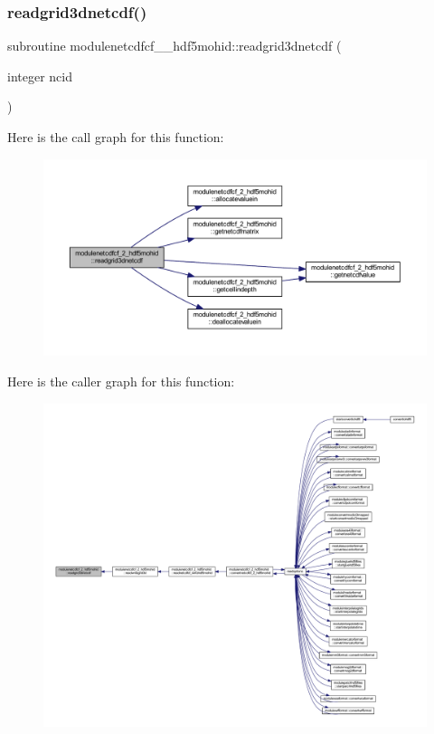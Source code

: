 \subsubsection{\texorpdfstring{readgrid3dnetcdf()}{readgrid3dnetcdf()}}
{\footnotesize\ttfamily subroutine modulenetcdfcf\+\_\+\_\+hdf5mohid\+::readgrid3dnetcdf (\begin{DoxyParamCaption}\item[{integer}]{ncid }\end{DoxyParamCaption})\hspace{0.3cm}{\ttfamily [private]}}

Here is the call graph for this function\+:\nopagebreak
\begin{figure}[H]
\begin{center}
\leavevmode
\includegraphics[width=350pt]{namespacemodulenetcdfcf__2__hdf5mohid_a6fedd55132323077153e16ddf06c3fc1_cgraph}
\end{center}
\end{figure}
Here is the caller graph for this function\+:\nopagebreak
\begin{figure}[H]
\begin{center}
\leavevmode
\includegraphics[width=350pt]{namespacemodulenetcdfcf__2__hdf5mohid_a6fedd55132323077153e16ddf06c3fc1_icgraph}
\end{center}
\end{figure}
